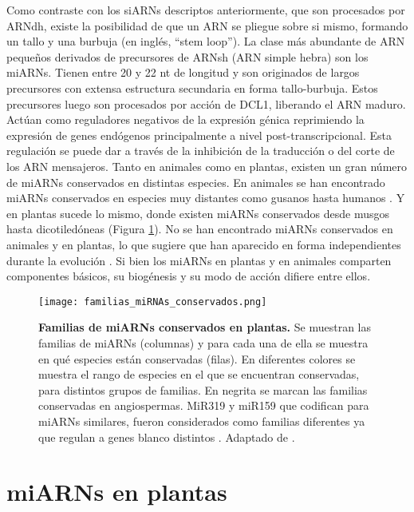 Como contraste con los siARNs descriptos anteriormente, que son procesados por ARNdh, existe la posibilidad de que un ARN se pliegue sobre si mismo, formando un tallo y una burbuja (en inglés, ``stem loop'').
La clase más abundante de ARN pequeños derivados de precursores de ARNsh (ARN simple hebra) son los miARNs.
Tienen entre 20 y 22 nt de longitud y son originados de largos precursores con extensa estructura secundaria en forma tallo-burbuja.
Estos precursores luego son procesados por acción de DCL1, liberando el ARN maduro. 
Actúan como reguladores negativos de la expresión génica reprimiendo la expresión de genes endógenos principalmente a nivel post-transcripcional.
Esta regulación se puede dar a través de la inhibición de la traducción o del corte de los ARN mensajeros.
Tanto en animales como en plantas, existen un gran número de miARNs conservados en distintas especies.
En animales se han encontrado miARNs conservados en especies muy distantes como gusanos hasta humanos \citep{pmid11081512}.
Y en plantas sucede lo mismo, donde existen miARNs conservados desde musgos hasta dicotiledóneas \citep{pmid15849273,Axtell2008343,citeulike:8816489} (Figura \ref{fig:familias_miRNAs_conservados}).
No se han encontrado miARNs conservados en animales y en plantas, lo que sugiere que han aparecido en forma independientes durante la evolución \citep{citeulike:8816489}.
Si bien los miARNs en plantas y en animales comparten componentes básicos, su biogénesis y su modo de acción difiere entre ellos.


\begin{figure}[htbp!] 
    \centering    
    \texttt{[image: familias\_miRNAs\_conservados.png]}
    \caption[Familias de miARNs conservados en plantas]{
    \textbf{Familias de miARNs conservados en plantas.}
    Se muestran las familias de miARNs (columnas) y para cada una de ella se muestra en qué especies están conservadas (filas).
    En diferentes colores se muestra el rango de especies en el que se encuentran conservadas, para distintos grupos de familias.
    En negrita se marcan las familias conservadas en angiospermas. 
    MiR319 y miR159 que codifican para miARNs similares, fueron considerados como familias diferentes ya que regulan a genes blanco distintos \citep{Palatnik2007}.
    Adaptado de \citep{citeulike:8816489}.
    }
    \label{fig:familias_miRNAs_conservados}
\end{figure}

\section{miARNs en plantas}

